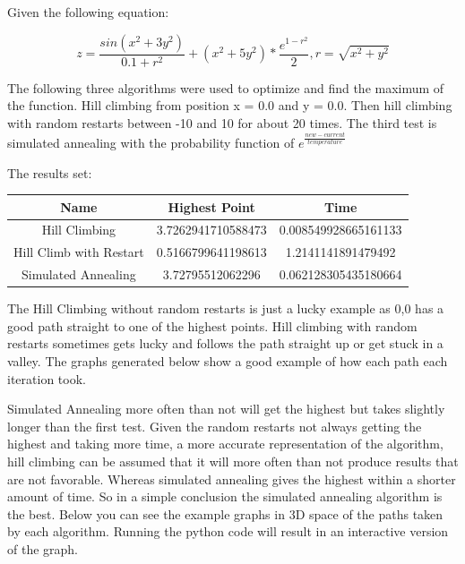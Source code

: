 \documentclass[a4paper,12pt]{article}
\begin{document}
\pagestyle{headings}

Given the following equation:

\begin{equation}
z = \frac{sin(x^2 + 3y^2)}{0.1+r^2}
+ (x^2 + 5y^2) * \frac{e^{1-r^2}}{2},
r = \sqrt{x^2+y^2}
\end{equation}

The following three algorithms were used to optimize and find the maximum of the function. Hill climbing from position x = 0.0 and y = 0.0. Then hill climbing with random restarts between -10 and 10 for about 20 times. The third test is simulated annealing with the probability function of $ e^{\frac{new-current}{temperature}} $

The results set:

\begin{center}
 \begin{tabular}{c c c}
 \hline
 Name & Highest Point & Time  \\ [0.5ex]
 \hline\hline
 Hill Climbing & 3.7262941710588473 & 0.008549928665161133  \\
 \hline
 Hill Climb with Restart & 0.5166799641198613 & 1.2141141891479492 \\
 \hline
 Simulated Annealing & 3.72795512062296 & 0.062128305435180664 \\
 \hline
\end{tabular}
\end{center}

The Hill Climbing without random restarts is just a lucky example as 0,0 has a good path straight to one of the highest points. Hill climbing with random restarts sometimes gets lucky and follows the path straight up or get stuck in a valley. The graphs generated below show a good example of how each path each iteration took.

Simulated Annealing more often than not will get the highest but takes slightly longer than the first test. Given the random restarts not always getting the highest and taking more time, a more accurate representation of the algorithm, hill climbing can be assumed that it will more often than not produce results that are not favorable. Whereas simulated annealing gives the highest within a shorter amount of time. So in a simple conclusion the simulated annealing algorithm is the best. Below you can see the example graphs in 3D space of the paths taken by each algorithm. Running the python code will result in an interactive version of the graph.
\end{document}
